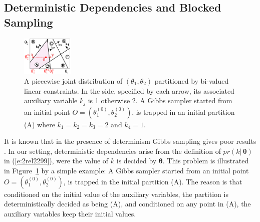 \documentclass[letterpaper]{article}
\begin{document}
\subsection{Deterministic Dependencies and Blocked Sampling}
\label{sect:deterministic}
\begin{figure}
  \centering
  \includegraphics[width=0.22\textwidth]{pic/colxx.pdf}
\vspace{-1mm}
\caption{\footnotesize
A piecewise joint distribution of $(\theta_1, \theta_2)$ partitioned by bi-valued linear constraints.
In the side, specified by each arrow, its associated auxiliary variable $k_j$ is 1 otherwise 2.
A Gibbs sampler started from an initial point $O = (\theta_1^{(0)}, \theta_2^{(0)})$, is trapped in an initial partition (A) 
where $k_1 = k_2 = k_3 = 2$ and $k_4 = 1$. 
}
\label{fig:simple.example}
\end{figure}
It is known that in the presence of determinism Gibbs sampling gives poor results \cite{Poon:06}.
In our setting, deterministic dependencies arise from the definition of $pr(k |\, \boldsymbol\theta)$ in (\ref{e:2rel2299}), were the value of $k$ is  decided by $\boldsymbol{\theta}$.
This problem is illustrated in Figure~\ref{fig:simple.example} by a simple example:
A Gibbs sampler started from an initial point $O=(\theta_1^{(0)}, \theta_2^{(0)})$, 
is trapped in the initial partition (A). 
The reason is that conditioned on the initial value of the auxiliary variables, 
the partition is deterministically decided as being (A), and conditioned on any 
point in (A), the auxiliary variables keep their initial values. %
\end{document}
